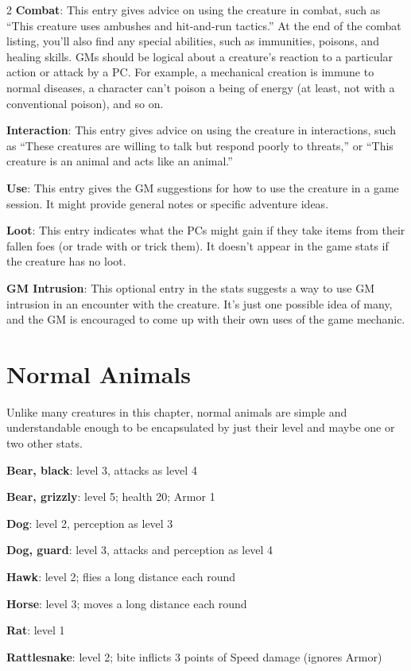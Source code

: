 \begin{multicols}{2}
\textbf{Combat}: This entry gives advice on using the creature in combat, such as “This creature uses ambushes and hit-and-run tactics.” At the end of the combat listing, you’ll also find any special abilities, such as immunities, poisons, and healing skills. GMs should be logical about a creature’s reaction to a particular action or attack by a PC. For example, a mechanical creation is immune to normal diseases, a character can’t poison a being of energy (at least, not with a conventional poison), and so on.

\textbf{Interaction}: This entry gives advice on using the creature in interactions, such as “These creatures are willing to talk but respond poorly to threats,” or “This creature is an animal and acts like an animal.”

\textbf{Use}: This entry gives the GM suggestions for how to use the creature in a game session. It might provide general notes or specific adventure ideas.

\textbf{Loot}: This entry indicates what the PCs might gain if they take items from their fallen foes (or trade with or trick them). It doesn’t appear in the game stats if the creature has no loot.

\textbf{GM Intrusion}: This optional entry in the stats suggests a way to use GM intrusion in an encounter with the creature. It’s just one possible idea of many, and the GM is encouraged to come up with their own uses of the game mechanic.

\section{Normal Animals}

Unlike many creatures in this chapter, normal animals are simple and understandable enough to be encapsulated by just their level and maybe one or two other stats.

\textbf{Bear, black}: level 3, attacks as level 4

\textbf{Bear, grizzly}: level 5; health 20; Armor 1

\textbf{Dog}: level 2, perception as level 3

\textbf{Dog, guard}: level 3, attacks and perception as level 4

\textbf{Hawk}: level 2; flies a long distance each round

\textbf{Horse}: level 3; moves a long distance each round

\textbf{Rat}: level 1

\textbf{Rattlesnake}: level 2; bite inflicts 3 points of Speed damage (ignores Armor)

\end{multicols}

